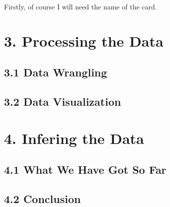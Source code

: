 \documentclass[
]{article}
\begin{document}
Firstly, of course I will need the name of the card.

\hypertarget{processing-the-data}{%
\section{3. Processing the Data}\label{processing-the-data}}

\hypertarget{data-wrangling}{%
\subsection{3.1 Data Wrangling}\label{data-wrangling}}

\hypertarget{data-visualization}{%
\subsection{3.2 Data Visualization}\label{data-visualization}}

\hypertarget{infering-the-data}{%
\section{4. Infering the Data}\label{infering-the-data}}

\hypertarget{what-we-have-got-so-far}{%
\subsection{4.1 What We Have Got So Far}\label{what-we-have-got-so-far}}

\hypertarget{conclusion}{%
\subsection{4.2 Conclusion}\label{conclusion}}
\end{document}
